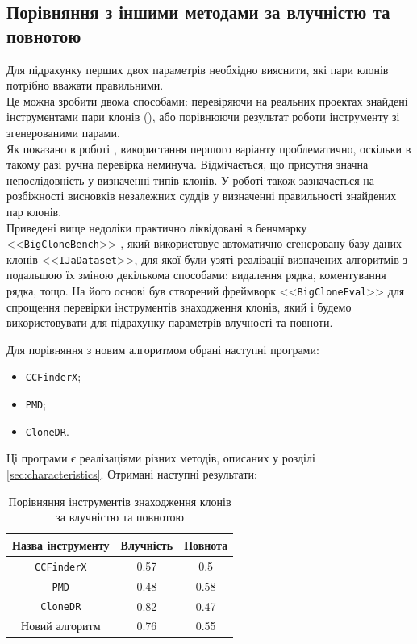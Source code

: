 \documentclass[a4paper, 14pt]{article}
\begin{document}
\subsection{Порівняння з іншими методами за влучністю та повнотою}
\par Для підрахунку перших двох параметрів необхідно вияснити, які пари клонів потрібно вважати правильними. \\ 
Це можна зробити двома способами: перевіряючи на реальних проектах знайдені інструментами пари клонів (\cite{Bellon07}), або порівнюючи результат роботи інструменту зі згенерованими парами. \\ 
Як показано в роботі \cite{Roy18}, використання першого варіанту проблематично, оскільки в такому разі ручна перевірка неминуча. Відмічається, що присутня значна непослідовність у визначенні типів клонів. У роботі \cite{Charpentier15} також зазначається на розбіжності висновків незалежних суддів у визначенні правильності знайдених пар клонів. \\
Приведені вище недоліки практично ліквідовані в бенчмарку <<\verb|BigCloneBench|>> \cite{Svajlenko14}, який використовує автоматично сгенеровану базу даних клонів <<\verb|IJaDataset|>>, для якої були узяті реалізації визначених алгоритмів з подальшою їх зміною декількома способами: видалення рядка, коментування рядка, тощо. На його основі був створений фреймворк <<\verb|BigCloneEval|>> для спрощення перевірки інструментів знаходження клонів, який і будемо використовувати для підрахунку параметрів влучності та повноти. \par
Для порівняння з новим алгоритмом обрані наступні програми:
\begin{itemize}
\item \verb|CCFinderX|;
\item \verb|PMD|;
\item \verb|CloneDR|.
\end{itemize}
Ці програми є реалізаціями різних методів, описаних у розділі \ref{sec:characteristics}.
Отримані наступні результати: \\
\begin{table}[ht]
\centering
\caption{\centering Порівняння інструментів знаходження клонів за влучністю та повнотою}
 \begin{tabular}{| c | c | c |} 
 \hline
 Назва інструменту & Влучність & Повнота \\ [0.5ex] 
 \hline
 \verb|CCFinderX| & 0.57 & 0.5 \\ 
 \hline
 \verb|PMD| & 0.48 & 0.58 \\
 \hline
 \verb|CloneDR| & 0.82 & 0.47 \\
 \hline
 Новий алгоритм & 0.76 & 0.55 \\ [1ex]
 \hline
\end{tabular} 
\end{table} \\
\end{document}
